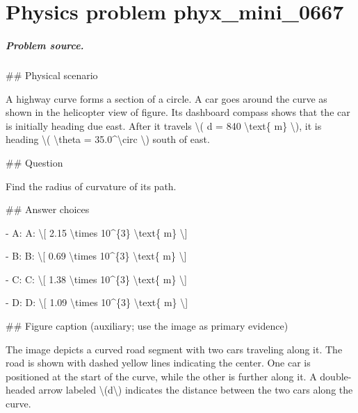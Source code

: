 
\chapter{Physics problem phyx\_mini\_0667}
\label{ch:PhyXMiniProblems_problem_phyx_mini_0667}

\paragraph{Problem source.}
\#\# Physical scenario

A highway curve forms a section of a circle. A car goes around the curve as shown in the helicopter view of figure. Its dashboard compass shows that the car is initially heading due east. After it travels \textbackslash{}( d = 840 \textbackslash{}text\{ m\} \textbackslash{}), it is heading \textbackslash{}( \textbackslash{}theta = 35.0\textasciicircum{}\textbackslash{}circ \textbackslash{}) south of east.

\#\# Question

Find the radius of curvature of its path.

\#\# Answer choices

- A: A: \textbackslash{}[ 2.15 \textbackslash{}times 10\textasciicircum{}\{3\} \textbackslash{}text\{ m\} \textbackslash{}]

- B: B: \textbackslash{}[ 0.69 \textbackslash{}times 10\textasciicircum{}\{3\} \textbackslash{}text\{ m\} \textbackslash{}]

- C: C: \textbackslash{}[ 1.38 \textbackslash{}times 10\textasciicircum{}\{3\} \textbackslash{}text\{ m\} \textbackslash{}]

- D: D: \textbackslash{}[ 1.09 \textbackslash{}times 10\textasciicircum{}\{3\} \textbackslash{}text\{ m\} \textbackslash{}]

\#\# Figure caption (auxiliary; use the image as primary evidence)

The image depicts a curved road segment with two cars traveling along it. The road is shown with dashed yellow lines indicating the center. One car is positioned at the start of the curve, while the other is further along it. A double-headed arrow labeled \textbackslash{}(d\textbackslash{}) indicates the distance between the two cars along the curve.


